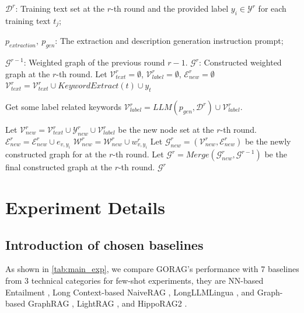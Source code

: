 \begin{algorithm}[t]
	\caption{Graph Construction Algorithm of GORAG at round $r$}\label{alg:graph_construction}
	\begin{algorithmic}[1]
		\REQUIRE $\mathcal{D}^r$: Training text set at the $r$-th round and the provided label $y_i \in \mathcal{Y}^r$ for each training text $t_j$; 
		
		$p_{extraction},\ p_{gen}$: The extraction and description generation instruction prompt; 
		
		$\mathcal{G}^{r-1}$: Weighted graph of the previous round $r-1$.
		\ENSURE $\mathcal{G}^r$: Constructed weighted graph at the $r$-th round.
		\STATE Let $\mathcal{V}_{text}^r=\emptyset$, $\mathcal{V}_{label}^r=\emptyset$, $\mathcal{E}_{new}^r=\emptyset$
		\STATE $\mathcal{V}_{text}^r=\mathcal{V}_{text}^r\cup KeywordExtract(t) \cup y_t$
		
		\ENDFOR
		\STATE Get some label related keywords $\mathcal{V}_{label}^r=LLM(p_{gen},\mathcal{D}^r)\cup \mathcal{V}_{label}^r$.
		
		
		\ENDFOR
		\ENDIF
		\STATE Let $\mathcal{V}_{new}^r=\mathcal{V}_{text}^r \cup \mathcal{Y}^r_{new} \cup \mathcal{V}_{label}^r$ be the new node set at the $r$-th round.
		\STATE $\mathcal{E}_{new}^r=\mathcal{E}_{new}^r\cup e_{v,y_i}$
		\STATE $\mathcal{W}_{new}^r=\mathcal{W}_{new}^r\cup w_{v,y_i}^r$
		\ENDFOR
		\STATE Let $\mathcal{G}^r_{new}=(\mathcal{V}_{new}^r,\mathcal{E}_{new}^r)$ be the newly constructed graph for at the $r$-th round.
		\STATE Let $\mathcal{G}^r=Merge(\mathcal{G}^r_{new}, \mathcal{G}^{r-1})$ be the final constructed graph at the $r$-th round.
		\RETURN  $\mathcal{G}^r$
	\end{algorithmic}
\end{algorithm}




\section{Experiment Details}\label{sec:exp_detail}
\subsection{Introduction of chosen baselines}
\label{sec:baselines}
	As shown in \autoref{tab:main_exp},  we compare GORAG's performance with 7 baselines from 3 technical categories for few-shot experiments, they are NN-based Entailment \cite{xia-etal-2021-incremental}, Long Context-based NaiveRAG \cite{gao2023retrieval}, LongLLMLingua \cite{jiang-etal-2024-longllmlingua}, and Graph-based  GraphRAG \cite{edge2024local}, LightRAG \cite{guo2024lightrag}, and HippoRAG2 \cite{gutiérrez2025ragmemory}.


